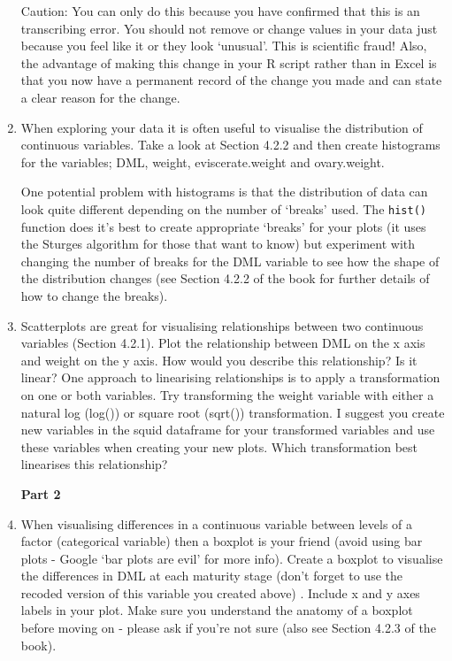 \documentclass[12pt]{article}
\newcommand{\lst}[1]{\lstinline{#1}}
\begin{document}
\begin{enumerate}
Caution: You can only do this because you have confirmed that this is an transcribing error. You should not remove or change values in your data just because you feel like it or they look ‘unusual’. This is scientific fraud! Also, the advantage of making this change in your R script rather than in Excel is that you now have a permanent record of the change you made and can state a clear reason for the change.

 \item When exploring your data it is often useful to visualise the distribution of continuous variables. Take a look at Section 4.2.2 and then create histograms for the variables; DML, weight, eviscerate.weight and ovary.weight. 
 
One potential problem with histograms is that the distribution of data can look quite different depending on the number of ‘breaks’ used. The \lst{hist()} function does it’s best to create appropriate ‘breaks’ for your plots (it uses the Sturges algorithm for those that want to know) but experiment with changing the number of breaks for the DML variable to see how the shape of the distribution changes (see Section 4.2.2 of the book for further details of how to change the breaks).

 
\item Scatterplots are great for visualising relationships between two continuous variables (Section 4.2.1). Plot the relationship between DML on the x axis and weight on the y axis. How would you describe this relationship? Is it linear? One approach to linearising relationships is to apply a transformation on one or both variables. Try transforming the weight variable with either a natural log (log()) or square root (sqrt()) transformation. I suggest you create new variables in the squid dataframe for your transformed variables and use these variables when creating your new plots. Which transformation best linearises this relationship? 

\centerline{\bf Part 2}
 
\item When visualising differences in a continuous variable between levels of a factor (categorical variable) then a boxplot is your friend (avoid using bar plots - Google ‘bar plots are evil’ for more info). Create a boxplot to visualise the differences in DML at each maturity stage (don’t forget to use the recoded version of this variable you created above) . Include x and y axes labels in your plot. Make sure you understand the anatomy of a boxplot before moving on - please ask if you’re not sure (also see Section 4.2.3 of the book). 


\end{enumerate}
\end{document}
